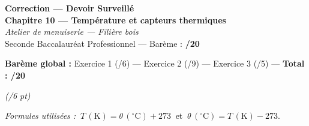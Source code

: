 \documentclass[a4paper,11pt]{article}
\begin{document}
\begin{center}
{\LARGE\bfseries\color{violet} Correction — Devoir Surveillé}\\[4pt]
{\large\bfseries Chapitre 10 — Température et capteurs thermiques}\\[4pt]
{\normalsize\itshape Atelier de menuiserie — Filière bois}\\[4pt]
{\normalsize Seconde Baccalauréat Professionnel — Barème : \textbf{/20}}
\end{center}

\vspace{6pt}
\begin{bareme}
\textbf{Barème global :} Exercice 1 (/6) — Exercice 2 (/9) — Exercice 3 (/5) — \textbf{Total : /20}
\end{bareme}

\vspace{6pt}
 \hfill\textit{\small(/6 pt)}

\vspace{2pt}
\textit{Formules utilisées :} $\ T\,(\text{K}) = \theta\,(^\circ\text{C}) + 273\ $ et $\ \theta\,(^\circ\text{C}) = T\,(\text{K}) - 273$.
\end{document}
